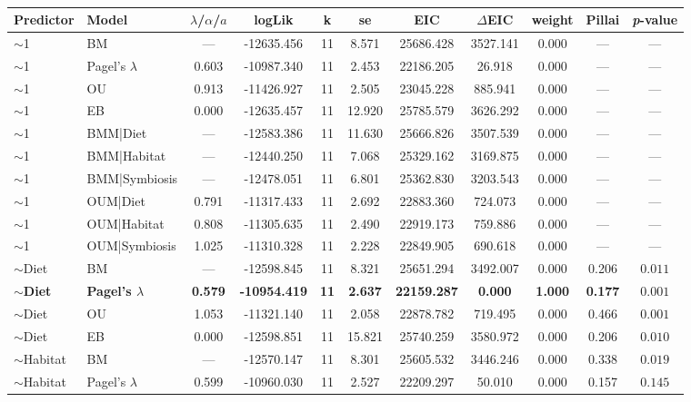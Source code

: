 \begin{table}
\centering
\caption{\label{tab:mvgls_morpho}}
\centering
\begin{tabular}[t]{llccccccccc}
\toprule
Predictor & Model & $\lambda$/$\alpha$/$a$ & logLik & k & se & EIC & $\Delta$EIC & weight & Pillai & \textit{p}-value\\
\midrule
$\sim$1 & BM & --- & -12635.456 & 11 & 8.571 & 25686.428 & 3527.141 & 0.000 & --- & ---\\
$\sim$1 & Pagel's $\lambda$ & 0.603 & -10987.340 & 11 & 2.453 & 22186.205 & 26.918 & 0.000 & --- & ---\\
$\sim$1 & OU & 0.913 & -11426.927 & 11 & 2.505 & 23045.228 & 885.941 & 0.000 & --- & ---\\
$\sim$1 & EB & 0.000 & -12635.457 & 11 & 12.920 & 25785.579 & 3626.292 & 0.000 & --- & ---\\
\addlinespace
$\sim$1 & BMM|Diet & --- & -12583.386 & 11 & 11.630 & 25666.826 & 3507.539 & 0.000 & --- & ---\\
$\sim$1 & BMM|Habitat & --- & -12440.250 & 11 & 7.068 & 25329.162 & 3169.875 & 0.000 & --- & ---\\
$\sim$1 & BMM|Symbiosis & --- & -12478.051 & 11 & 6.801 & 25362.830 & 3203.543 & 0.000 & --- & ---\\
$\sim$1 & OUM|Diet & 0.791 & -11317.433 & 11 & 2.692 & 22883.360 & 724.073 & 0.000 & --- & ---\\
$\sim$1 & OUM|Habitat & 0.808 & -11305.635 & 11 & 2.490 & 22919.173 & 759.886 & 0.000 & --- & ---\\
$\sim$1 & OUM|Symbiosis & 1.025 & -11310.328 & 11 & 2.228 & 22849.905 & 690.618 & 0.000 & --- & ---\\
\addlinespace
$\sim$Diet & BM & --- & -12598.845 & 11 & 8.321 & 25651.294 & 3492.007 & 0.000 & 0.206 & $0.011$\\
\textbf{$\sim$Diet} & \textbf{Pagel's $\lambda$} & \textbf{0.579} & \textbf{-10954.419} & \textbf{11} & \textbf{2.637} & \textbf{22159.287} & \textbf{0.000} & \textbf{1.000} & \textbf{0.177} & \textbf{$0.001$}\\
$\sim$Diet & OU & 1.053 & -11321.140 & 11 & 2.058 & 22878.782 & 719.495 & 0.000 & 0.466 & $0.001$\\
$\sim$Diet & EB & 0.000 & -12598.851 & 11 & 15.821 & 25740.259 & 3580.972 & 0.000 & 0.206 & $0.010$\\
\addlinespace
$\sim$Habitat & BM & --- & -12570.147 & 11 & 8.301 & 25605.532 & 3446.246 & 0.000 & 0.338 & $0.019$\\
$\sim$Habitat & Pagel's $\lambda$ & 0.599 & -10960.030 & 11 & 2.527 & 22209.297 & 50.010 & 0.000 & 0.157 & $0.145$\\

\end{tabular}
\end{table}
